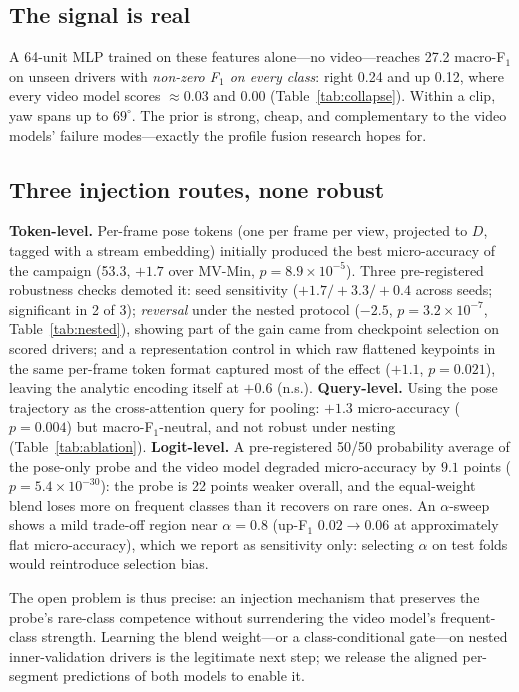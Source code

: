 \documentclass[journal]{IEEEtran}
\newcommand{\micro}{micro-accuracy}
\newcommand{\mF}{macro-F$_1$}
\newcommand{\mvmin}{MV-Min}
\begin{document}
\subsection{The signal is real}
A 64-unit MLP trained on these features alone---no video---reaches
27.2 \mF{} on unseen drivers with \emph{non-zero F$_1$ on every class}:
right 0.24 and up 0.12, where every video model scores ${\approx}0.03$ and
$0.00$ (Table~\ref{tab:collapse}).  Within a clip, yaw spans up to
$69^\circ$.  The prior is strong, cheap, and complementary to the video
models' failure modes---exactly the profile fusion research hopes for.

\subsection{Three injection routes, none robust}
\textbf{Token-level.}  Per-frame pose tokens (one per frame per view,
projected to $D$, tagged with a stream embedding) initially produced the
best \micro{} of the campaign (53.3, $+1.7$ over \mvmin{},
$p{=}8.9\times10^{-5}$).  Three pre-registered robustness checks demoted
it: seed sensitivity ($+1.7/+3.3/+0.4$ across seeds; significant in 2 of
3); \emph{reversal} under the nested protocol ($-2.5$,
$p{=}3.2\times10^{-7}$, Table~\ref{tab:nested}), showing part of the gain
came from checkpoint selection on scored drivers; and a representation
control in which raw flattened keypoints in the same per-frame token format
captured most of the effect ($+1.1$, $p{=}0.021$), leaving the analytic
encoding itself at $+0.6$ (n.s.).
\textbf{Query-level.}  Using the pose trajectory as the cross-attention
query for pooling: $+1.3$ \micro{} ($p{=}0.004$) but \mF-neutral, and not
robust under nesting (Table~\ref{tab:ablation}).
\textbf{Logit-level.}  A pre-registered 50/50 probability average of the
pose-only probe and the video model degraded \micro{} by $9.1$ points
($p{=}5.4\times10^{-30}$): the probe is 22 points weaker overall, and the
equal-weight blend loses more on frequent classes than it recovers on rare
ones.  An $\alpha$-sweep shows a mild trade-off region near $\alpha{=}0.8$
(up-F$_1$ $0.02{\to}0.06$ at approximately flat \micro), which we report as
sensitivity only: selecting $\alpha$ on test folds would reintroduce
selection bias.

The open problem is thus precise: an injection mechanism that preserves the
probe's rare-class competence without surrendering the video model's
frequent-class strength.  Learning the blend weight---or a
class-conditional gate---on nested inner-validation drivers is the
legitimate next step; we release the aligned per-segment predictions of
both models to enable it.
\end{document}
